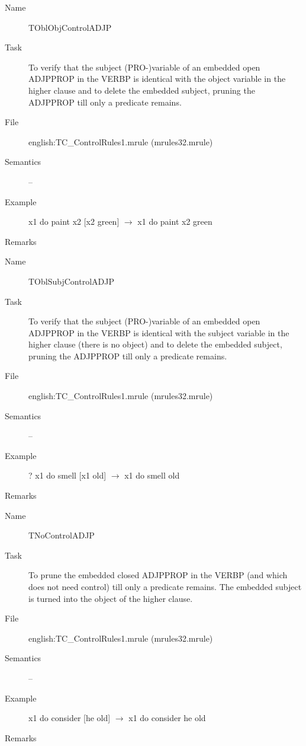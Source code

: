 \begin{description}
\vspace{1 cm}
\begin{description}
\item[Name] TOblObjControlADJP
\item[Task] To verify that the subject (PRO-)variable of an embedded 
open ADJPPROP in the VERBP is identical with the object variable in the 
higher clause 
and to delete the embedded subject, pruning the ADJPPROP till only a predicate 
remains. 
\item[File] english:TC\_ControlRules1.mrule (mrules32.mrule)
\item[Semantics] --
\item[Example] x1 do paint x2 [x2 green] $\rightarrow$ x1 do paint x2 green
\item[Remarks] 
\end{description}

\vspace{1 cm}
\begin{description}
\item[Name] TOblSubjControlADJP
\item[Task] To verify that  the subject (PRO-)variable of an embedded 
open ADJPPROP in the VERBP is identical with the subject variable in the 
higher clause (there is no object)
and to delete the embedded subject, pruning the ADJPPROP till only a predicate 
remains. 
\item[File] english:TC\_ControlRules1.mrule (mrules32.mrule)
\item[Semantics] --
\item[Example] ? x1 do smell [x1 old] $\rightarrow$ x1 do smell old
\item[Remarks] 
\end{description}

\vspace{1 cm}
\begin{description}
\item[Name] TNoControlADJP
\item[Task] To prune the embedded closed ADJPPROP in the VERBP 
(and which does not need control) 
till only a predicate remains. The embedded subject is turned into the object 
of the higher clause.
\item[File] english:TC\_ControlRules1.mrule (mrules32.mrule)
\item[Semantics] --
\item[Example] x1 do consider [he old] $\rightarrow$ x1 do consider he old
\item[Remarks] 
\end{description}


\end{description}

